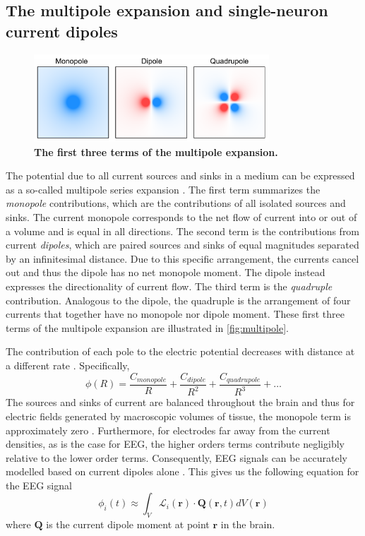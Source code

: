 \subsection{The multipole expansion and single-neuron current dipoles}

\begin{figure}
\vspace{-17pt}
\centering
\includegraphics[width=88mm]{Figures/chapter1/multipole_expansion.pdf}
\vspace{-22pt}
\caption{\textbf{The first three terms of the multipole expansion.}}  \label{fig:multipole}
\end{figure}

The potential due to all current sources and sinks in a medium can be expressed as a so-called multipole series expansion \cite{Nunez2006}. The first term summarizes the \textit{monopole} contributions, which are the contributions of all isolated sources and sinks. The current monopole corresponds to the net flow of current into or out of a volume and is equal in all directions. The second term is the contributions from current \textit{dipoles}, which are paired sources and sinks of equal magnitudes separated by an infinitesimal distance. Due to this specific arrangement, the currents cancel out and thus the dipole has no net monopole moment. The dipole instead expresses the directionality of current flow. The third term is the \textit{quadruple} contribution. Analogous to the dipole, the quadruple is the arrangement of four currents that together have no monopole nor dipole moment. These first three terms of the multipole expansion are illustrated in \autoref{fig:multipole}. 

The contribution of each pole to the electric potential decreases with distance at a different rate \cite{Nunez2006}. Specifically,
\begin{equation*}
    \phi(R) = \frac{C_{monopole}}{R} + \frac{C_{dipole}}{R^2}  + \frac{C_{quadrupole}}{R^3}  + \dots
\end{equation*}
The sources and sinks of current are balanced throughout the brain and thus for electric fields generated by macroscopic volumes of tissue, the monopole term is approximately zero \cite{Nunez2006}. Furthermore, for electrodes far away from the current densities, as is the case for EEG, the higher orders terms contribute negligibly relative to the lower order terms. Consequently, EEG signals can be accurately modelled based on current dipoles alone \cite{Nunez2006,RevModPhys.65.413}. This gives us the following equation for the EEG signal \cite{RevModPhys.65.413}
\begin{equation} \label{eq:lead_solution}
    \phi_i(t) \approx \int_V \mathcal{L}_i(\bm{r}) \cdot \bm{Q}(\bm{r},t) dV(\bm{r})
\end{equation}
where $\bm{Q}$ is the current dipole moment at point $\bm{r}$ in the brain. 

